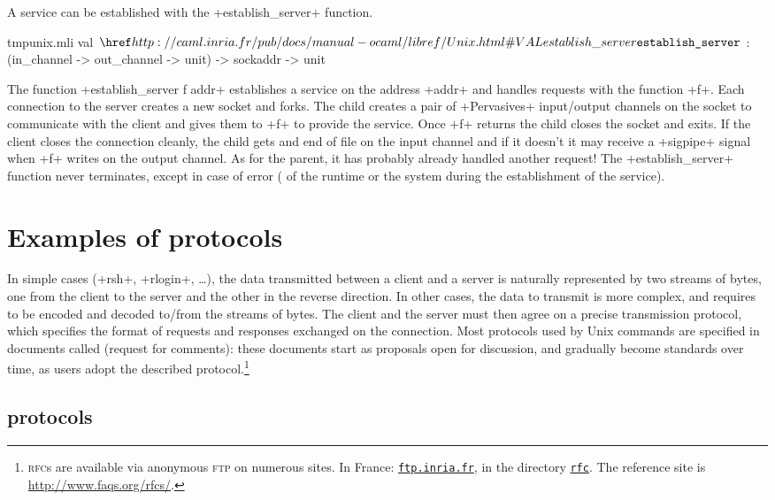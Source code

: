 A service can be established with the \ml+establish_server+ function.
%
\begin{listingcodefile}{tmpunix.mli}
val $\indexlibvalue{Unix}{establish\_server}$ :
  (in_channel -> out_channel -> unit) -> sockaddr -> unit
\end{listingcodefile}
% 
The function \ml+establish_server f addr+ establishes a service on the
address \ml+addr+ and handles requests with the function \ml+f+. Each
connection to the server creates a new socket and forks. The child
creates a pair of \ml+Pervasives+ input/output channels on the socket
to communicate with the client and gives them to \ml+f+ to provide the
service. Once \ml+f+ returns the child closes the socket and exits. If
the client closes the connection cleanly, the child gets and end of
file on the input channel and if it doesn't it may receive a
\ml+sigpipe+ signal when \ml+f+ writes on the output channel.  As for the
parent, it has probably already handled another request! The
\ml+establish_server+ function never terminates, except in
case of error (\eg{} of the {\ocaml} runtime or the system during
the establishment of the service).

\section{Examples of protocols}

In simple cases (\ml+rsh+, \ml+rlogin+, \ldots), the data transmitted
between a client and a server is naturally represented by two streams
of bytes, one from the client to the server and the other in the
reverse direction. In other cases, the data to transmit is more
complex, and requires to be encoded and decoded to/from the streams of
bytes. The client and the server must then agree on a precise
transmission protocol, which specifies the format of requests and
responses exchanged on the connection. Most protocols used by Unix
commands are specified in documents called 
(request for comments): these documents start as proposals open
for discussion, and gradually become standards over time, as users
adopt the described protocol.\footnote{\textsc{rfc}s are available
  via anonymous \textsc{ftp} on numerous sites. In France:
  \href{ftp://ftp.inria.fr}{\texttt{ftp.inria.fr}}, in the directory
  \href{ftp://ftp.inria.fr/pub/rfc/}{\texttt{rfc}}. The reference site
  is \url{http://www.faqs.org/rfcs/}. }


\subsection*{ protocols}

